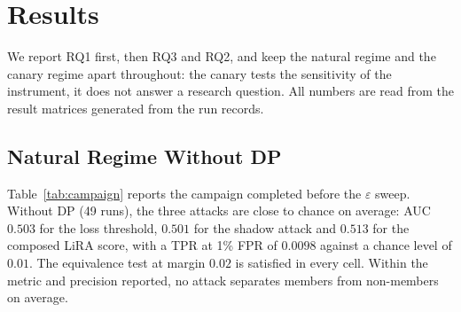 
\section{Results}
\label{sec:results}

We report RQ1 first, then RQ3 and RQ2, and keep the natural regime and the
canary regime apart throughout: the canary tests the sensitivity of the
instrument, it does not answer a research question. All numbers are read from the result matrices
generated from the run records.

\subsection{Natural Regime Without DP}
\label{sec:results-nodp}

Table~\ref{tab:campaign} reports the campaign completed before the
$\varepsilon$ sweep. Without DP (49 runs), the three attacks are close to
chance on average: AUC $0.503$ for the loss threshold, $0.501$ for the shadow
attack and $0.513$ for the composed LiRA score, with a TPR at 1\% FPR of
$0.0098$ against a chance level of $0.01$. The equivalence test at margin
$0.02$ is satisfied in every cell. Within the metric and precision reported,
no attack separates members from non-members on average.

